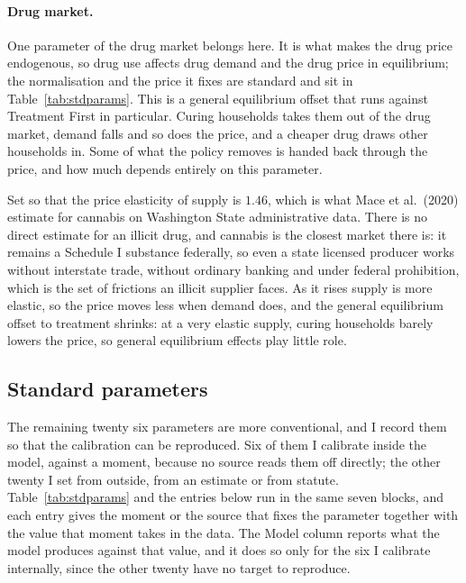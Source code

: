 \documentclass[10pt]{article}
\begin{document}
\paragraph{Drug market.} One parameter of the drug market belongs here.
It is what makes the drug price endogenous, so drug use affects drug demand and the
drug price in equilibrium; the normalisation and the price it fixes are standard
and sit in Table~\ref{tab:stdparams}. This is a general equilibrium offset that
runs against Treatment First in particular. Curing households takes them out of the
drug market, demand falls and so does the price, and a cheaper drug draws other
households in. Some of what the policy removes is handed back through the price,
and how much depends entirely on this parameter.
\begin{description}\setlength{\itemsep}{0.25em}\setlength{\parskip}{0em}
\item[$\nu_2$, the drug supply elasticity.] Set so that the price elasticity of
supply is $1.46$, which is what Mace et al.\ (2020) estimate for cannabis on
Washington State administrative data. There is no direct estimate for an illicit
drug, and cannabis is the closest market there is: it remains a Schedule I
substance federally, so even a state licensed producer works without interstate
trade, without ordinary banking and under federal prohibition, which is the set of
frictions an illicit supplier faces.
As it rises supply is more elastic, so the price moves less when demand does, and the general equilibrium offset to treatment shrinks: at a very elastic supply,
curing households barely lowers the price, so general equilibrium effects play
little role.
\end{description}

\subsection{Standard parameters}

The remaining twenty six parameters are more conventional, and I record them so
that the calibration can be reproduced. Six of them I calibrate inside the model,
against a moment, because no source reads them off directly; the other twenty I set
from outside, from an estimate or from statute. Table~\ref{tab:stdparams} and the
entries below run in the same seven blocks, and each entry gives the moment or the
source that fixes the parameter together with the value that moment takes in the
data. The Model column reports what the model produces against that value, and it
does so only for the six I calibrate internally, since the other twenty have no
target to reproduce.
\end{document}
